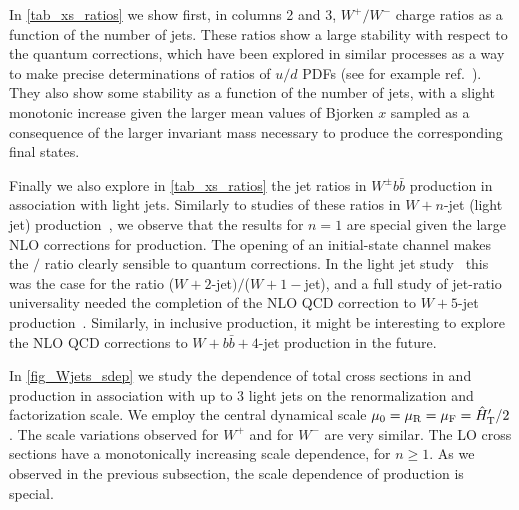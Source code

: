 In \cref{tab_xs_ratios} we show first, in columns 2 and 3, $W^+/W^-$ charge
ratios as a function of the number of jets. These ratios show a large stability
with respect to the quantum corrections, which have been explored in similar
processes as a way to make precise determinations of ratios of $u/d$ PDFs (see
for example ref.~\cite{Kom:2010mv}). They also show some stability as a function
of the number of jets, with a slight monotonic increase given the larger mean
values of Bjorken $x$ sampled as a consequence of the larger invariant mass necessary to
produce the corresponding final states.

Finally we also explore in \cref{tab_xs_ratios} the jet ratios in $W^\pm
b\bar b$ production in association with light jets. Similarly to studies of these ratios in $W+n$-jet (light jet)
production~\cite{BH:Wratios}, we observe that the results for $n=1$ are special
given the large NLO corrections for \Wbb{} production. The opening of an
initial-state channel makes the
\Wbbj{}$/$\Wbb{} ratio clearly sensible to quantum corrections. In the light jet
study~\cite{BH:Wratios} this was the case for the ratio ($W+2$-jet$)/$($W+1-$jet),
and a full study of jet-ratio universality needed the completion of the NLO QCD
correction to $W+5$-jet production~\cite{BH:W5j}. Similarly, in \Wbb{} inclusive
production, it might be interesting to explore the NLO QCD corrections to
$W+b\bar b+4$-jet production in the future.

In \cref{fig_Wjets_sdep} we study the dependence of total cross sections in
\Wbbm{} and \Wbbp{} production in association with up to 3 light jets on the
renormalization and factorization scale. We employ the central dynamical scale
$\mu_0=\mu_\mathrm{R}=\mu_\mathrm{F}={\hat H}_{\mathrm T}'/2$. The scale variations
observed for $W^+$ and for $W^-$ are very similar. The LO cross sections have a monotonically increasing
scale dependence, for $n\geq 1$.  As we observed in the previous subsection, the
scale dependence of \Wbb{} production is special.



